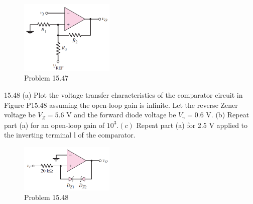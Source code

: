 \documentclass[a4paper,11pt,UTF8]{article}
\begin{document}
\begin{figure}[H]
	\centering
	\includegraphics[width=0.4\textwidth]{15.47}
	\caption{Problem 15.47}
\end{figure}
15.48 (a) Plot the voltage transfer characteristics of the comparator circuit in Figure P15.48 assuming the open-loop gain is infinite. Let the reverse Zener voltage be $V_{Z}=5.6$ V and the forward diode voltage be $V_{\gamma}=0.6$ V. (b) Repeat part (a) for an open-loop gain of $10^3.(c)$ Repeat part (a) for 2.5 V
applied to the inverting terminal l of the comparator.
\begin{figure}[H]
	\centering
	\includegraphics[width=0.4\textwidth]{15.48}
	\caption{Problem 15.48}
\end{figure}
	
\end{document}
